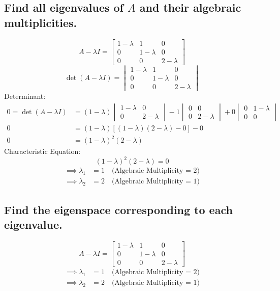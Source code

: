 \subsection{Find all eigenvalues of $A$ and their algebraic multiplicities.}
\[
	A-\lambda I = \begin{bmatrix}
		1-\lambda & 1         & 0         \\
		0         & 1-\lambda & 0         \\
		0         & 0         & 2-\lambda
	\end{bmatrix}
\]
\[
	\det(A - \lambda I) = \begin{vmatrix}
		1-\lambda & 1         & 0         \\
		0         & 1-\lambda & 0         \\
		0         & 0         & 2-\lambda
	\end{vmatrix}
\]
Determinant:
\[
	\begin{aligned}
		0 = \det(A - \lambda I) & = (1-\lambda) \begin{vmatrix} 1-\lambda & 0 \\ 0 & 2-\lambda \end{vmatrix} - 1 \begin{vmatrix} 0 & 0 \\ 0 & 2-\lambda \end{vmatrix} + 0 \begin{vmatrix} 0 & 1-\lambda \\ 0 & 0 \end{vmatrix} \\
		0                       & = (1-\lambda)[(1-\lambda)(2-\lambda) - 0] - 0                                                                                                                                                \\
		0                       & = (1-\lambda)^2(2-\lambda)
	\end{aligned}
\]
Characteristic Equation:
\[ (1-\lambda)^2 (2-\lambda) = 0 \]
\[
	\begin{aligned}
		\implies \lambda_1 & = 1 \quad \text{(Algebraic Multiplicity = 2)} \\
		\implies \lambda_2 & = 2 \quad \text{(Algebraic Multiplicity = 1)}
	\end{aligned}
\]

\subsection{Find the eigenspace corresponding to each eigenvalue.}
\[
	A-\lambda I = \begin{bmatrix}
		1-\lambda & 1         & 0         \\
		0         & 1-\lambda & 0         \\
		0         & 0         & 2-\lambda
	\end{bmatrix}
\]
\[
	\begin{aligned}
		\implies \lambda_1 & = 1 \quad \text{(Algebraic Multiplicity = 2)} \\
		\implies \lambda_2 & = 2 \quad \text{(Algebraic Multiplicity = 1)}
	\end{aligned}
\]

